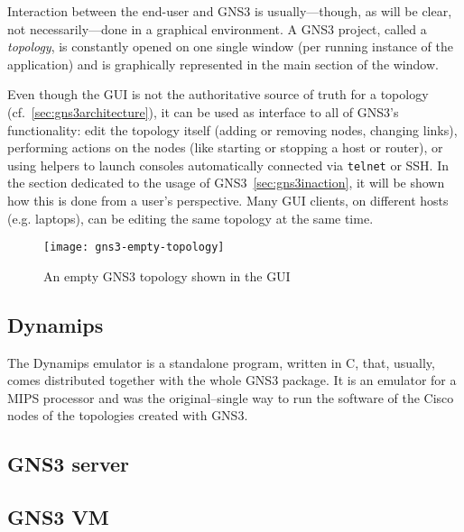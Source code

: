Interaction between the end-user and GNS3 is usually---though, as will be clear, not necessarily---done in a graphical environment.
A GNS3 project, called a \emph{topology}, is constantly opened on one single window (per running instance of the application) and is graphically represented in the main section of the window.

Even though the GUI is not the authoritative source of truth for a topology (cf.~\ref{sec:gns3architecture}), it can be used as interface to all of GNS3's functionality: edit the topology itself (adding or removing nodes, changing links), performing actions on the nodes (like starting or stopping a host or router), or using helpers to launch consoles automatically connected via \texttt{telnet} or SSH.
In the section dedicated to the usage of GNS3~\ref{sec:gns3inaction}, it will be shown how this is done from a user's perspective.
Many GUI clients, on different hosts (e.g. laptops), can be editing the same topology at the same time. %

\begin{figure}
  \centering
  \texttt{[image: gns3-empty-topology]}
  \caption{An empty GNS3 topology shown in the GUI}
  \label{fig:gns3-empty-topology}
\end{figure}

\subsection{Dynamips}
\label{subsec:gns3dynamips}

The Dynamips emulator is a standalone program, written in C, that, usually, comes distributed together with the whole GNS3 package.
It is an emulator for a MIPS processor and was the original--single way to run the software of the Cisco nodes of the topologies created with GNS3.


\subsection{GNS3 server}
\label{subsec:gns3server}


\subsection{GNS3 VM}
\label{subsec:gns3vm}

